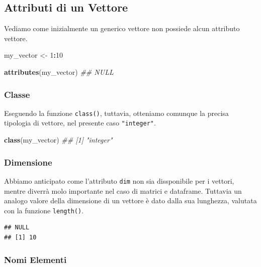 \documentclass[
]{book}
\newenvironment{Shaded}{\begin{snugshade}}{\end{snugshade}}
\newcommand{\CommentTok}[1]{\textcolor[rgb]{0.56,0.35,0.01}{\textit{#1}}}
\newcommand{\DecValTok}[1]{\textcolor[rgb]{0.00,0.00,0.81}{#1}}
\newcommand{\KeywordTok}[1]{\textcolor[rgb]{0.13,0.29,0.53}{\textbf{#1}}}
\newcommand{\NormalTok}[1]{#1}
\newcommand{\OperatorTok}[1]{\textcolor[rgb]{0.81,0.36,0.00}{\textbf{#1}}}
\newcommand{\StringTok}[1]{\textcolor[rgb]{0.31,0.60,0.02}{#1}}
\begin{document}
\hypertarget{attributi-di-un-vettore}{%
\subsection{Attributi di un Vettore}\label{attributi-di-un-vettore}}

Vediamo come inizialmente un generico vettore non possiede alcun attributo vettore.

\begin{Shaded}
\begin{Highlighting}[]
\NormalTok{my_vector <-}\StringTok{ }\DecValTok{1}\OperatorTok{:}\DecValTok{10}

\KeywordTok{attributes}\NormalTok{(my_vector)}
\CommentTok{## NULL}
\end{Highlighting}
\end{Shaded}

\hypertarget{classe}{%
\subsubsection*{Classe}\label{classe}}

Eseguendo la funzione \texttt{class()}, tuttavia, otteniamo comunque la precisa tipologia di vettore, nel presente caso \texttt{"integer"}.

\begin{Shaded}
\begin{Highlighting}[]
\KeywordTok{class}\NormalTok{(my_vector)}
\CommentTok{## [1] "integer"}
\end{Highlighting}
\end{Shaded}

\hypertarget{dimensione}{%
\subsubsection*{Dimensione}\label{dimensione}}

Abbiamo anticipato come l'attributo \texttt{dim} non sia dissponibile per i vettori, mentre diverrà molo importante nel caso di matrici e dataframe. Tuttavia un analogo valore della dimensione di un vettore è dato dalla sua lunghezza, valutata con la funzione \texttt{length()}.

\begin{verbatim}
## NULL
## [1] 10
\end{verbatim}

\hypertarget{nomi-elementi}{%
\subsubsection*{Nomi Elementi}\label{nomi-elementi}}
\end{document}
